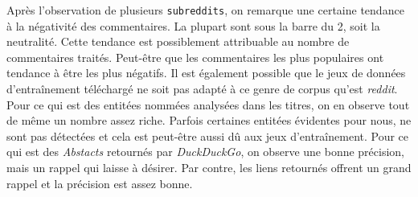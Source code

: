 \documentclass[12pt]{article}
\begin{document}
Après l'observation de plusieurs \verb;subreddits;, on remarque une certaine tendance à la négativité des commentaires. La plupart sont sous la barre du 2, soit la neutralité. Cette tendance est possiblement attribuable au nombre de commentaires traités. Peut-être que les commentaires les plus populaires ont tendance à être les plus négatifs. Il est également possible que le jeux de données d'entraînement téléchargé ne soit pas adapté à ce genre de corpus qu'est \textit{reddit}. Pour ce qui est des entitées nommées analysées dans les titres, on en observe tout de même un nombre assez riche. Parfois certaines entitées évidentes pour nous, ne sont pas détectées et cela est peut-être aussi dû aux jeux d'entraînement. Pour ce qui est des \textit{Abstacts} retournés par \textit{DuckDuckGo}, on observe une bonne précision, mais un rappel qui laisse à désirer. Par contre, les liens retournés offrent un grand rappel et la précision est assez bonne.

\end{document}
